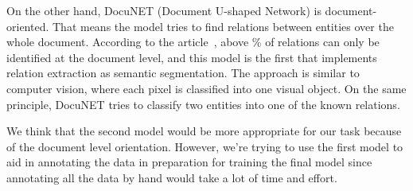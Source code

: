 \documentclass[fleqn,moreauthors,10pt]{ds_report}
\begin{document}
On the other hand, DocuNET (Document U-shaped Network) is document-oriented. That means the model tries to find relations between entities over the whole document. According to the article~\cite{ijcai2021-551}, above \% of relations can only be identified at the document level, and this model is the first that implements relation extraction as semantic segmentation. The approach is similar to computer vision, where each pixel is classified into one visual object. On the same principle, DocuNET tries to classify two entities into one of the known relations.

We think that the second model would be more appropriate for our task because of the document level orientation. However, we're trying to use the first model to aid in annotating the data in preparation for training the final model since annotating all the data by hand would take a lot of time and effort.









\end{document}
